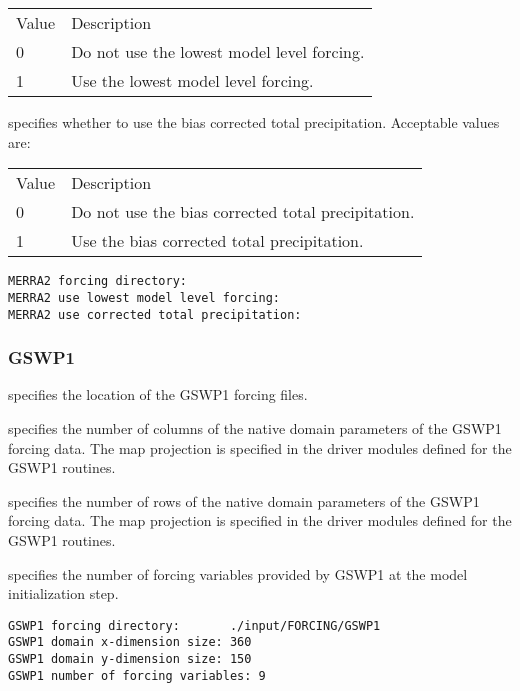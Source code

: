 \begin{tabular}{ll}
 Value & Description                                \\
 0     & Do not use the lowest model level forcing. \\
 1     & Use the lowest model level forcing.        \\
 \end{tabular}

  specifies whether
 to use the bias corrected total precipitation.
 Acceptable values are:

 \begin{tabular}{ll}
 Value & Description                                        \\
 0     & Do not use the bias corrected total precipitation. \\
 1     & Use the bias corrected total precipitation.        \\
 \end{tabular}
 

 \begin{Verbatim}[frame=single]
MERRA2 forcing directory:
MERRA2 use lowest model level forcing:
MERRA2 use corrected total precipitation:
 \end{Verbatim}

 
 \subsubsection{GSWP1} \label{sssec:forcings_gswp1}
 

 
  specifies the location of the
 GSWP1 forcing files.

  specifies the number of
 columns of the native domain parameters of the GSWP1 forcing data.
 The map projection is specified in the driver modules defined for
 the GSWP1 routines.

  specifies the number of
 rows of the native domain parameters of the GSWP1 forcing data.
 The map projection is specified in the driver modules defined for
 the GSWP1 routines.

  specifies the number of
 forcing variables provided by GSWP1 at the model initialization
 step.
 

 \begin{Verbatim}[frame=single]
GSWP1 forcing directory:       ./input/FORCING/GSWP1
GSWP1 domain x-dimension size: 360
GSWP1 domain y-dimension size: 150
GSWP1 number of forcing variables: 9
 \end{Verbatim}

